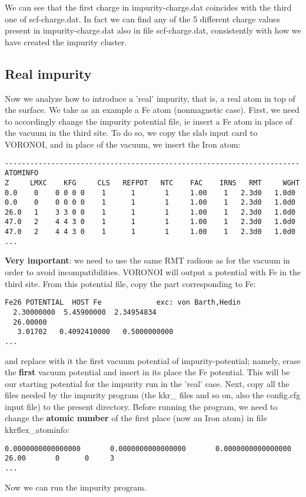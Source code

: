 \documentclass[11pt,fleqn]{book} %
\begin{document}
We can see that the first charge in impurity-charge.dat
coincides with the third one of scf-charge.dat. In fact
we can find any of the 5 different charge values present in
impurity-charge.dat also in file scf-charge.dat, consistently with
how we have created the impurity cluster.

\subsection{Real impurity}
\label{sec:real-impurity}

Now we analyze how to introduce a 'real' impurity,
that is, a real atom in top of the surface.
We take as an example a Fe atom (nonmagnetic case).
First, we need to accordingly change the impurity potential file,
ie insert a Fe atom in place of the vacuum in the third site.
To do so, we copy the slab input card to VORONOI, and in place
of the vacuum, we insert the Iron atom:
\begin{VBox}
\begin{verbatim}
----------------------------------------------------------------------
ATOMINFO
Z     LMXC    KFG     CLS   REFPOT   NTC    FAC    IRNS   RMT     WGHT
0.0    0    0 0 0 0    1      1       1     1.00    1   2.3d0   1.0d0
0.0    0    0 0 0 0    1      1       1     1.00    1   2.3d0   1.0d0
26.0   1    3 3 0 0    1      1       1     1.00    1   2.3d0   1.0d0
47.0   2    4 4 3 0    1      1       1     1.00    1   2.3d0   1.0d0
47.0   2    4 4 3 0    1      1       1     1.00    1   2.3d0   1.0d0
...
\end{verbatim}
\end{VBox}
\textbf{Very important}: we need to use the same RMT radious
as for the vacuum in order to avoid incompatibilities.
VORONOI will output a potential with Fe in the third site.
From this potential file, copy the part corresponding to Fe:
\begin{VBox}
\begin{verbatim}
Fe26 POTENTIAL  HOST Fe             exc: von Barth,Hedin
  2.30000000  5.45900000  2.34954834
  26.00000
   3.01702   0.4092410000   0.5000000000
...
\end{verbatim}
\end{VBox}
and replace with it the first
vacuum potential of impurity-potential; namely,
erase the \textbf{first} vacuum potential and insert in its
place the Fe potential.
This will be our starting potential for the impurity run
in the 'real' case. Next, copy all the files needed by the impurity program
(the kkr\_ files and so on, also the config.cfg input file) to the present directory.
Before running the program, we need to change the
\textbf{atomic number} of the first place (now an Iron atom)
in file kkrflex\_atominfo:
\begin{VBox}
{\scriptsize{
\begin{verbatim}
0.0000000000000000       0.0000000000000000       0.0000000000000000 26.00       0      0     3
...
\end{verbatim}
}}
\end{VBox}
Now we can run the impurity program.
\end{document}

